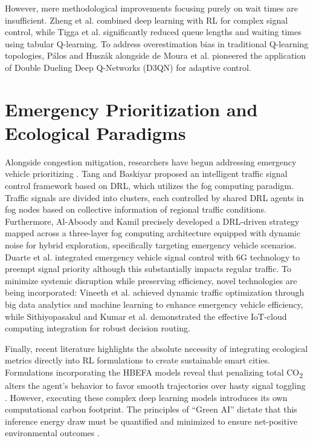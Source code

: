 However, mere methodological improvements focusing purely on wait times are insufficient. Zheng et al. \cite{zheng_dlrl} combined deep learning with RL for complex signal control, while Tigga et al. \cite{tigga_qlearning} significantly reduced queue lengths and waiting times using tabular Q-learning. To address overestimation bias in traditional Q-learning topologies, P\'alos and Husz\'ak \cite{palos2021evaluation} alongside de Moura et al. \cite{demoura2022multi} pioneered the application of Double Dueling Deep Q-Networks (D3QN) for adaptive control.

\section{Emergency Prioritization and Ecological Paradigms}
Alongside congestion mitigation, researchers have begun addressing emergency vehicle prioritizing \cite{ieee_iot_2025}. Tang and Baskiyar \cite{tang_fog} proposed an intelligent traffic signal control framework based on DRL, which utilizes the fog computing paradigm. Traffic signals are divided into clusters, each controlled by shared DRL agents in fog nodes based on collective information of regional traffic conditions. Furthermore, Al-Aboody and Kamil \cite{ieee_iot_2025} precisely developed a DRL-driven strategy mapped across a three-layer fog computing architecture equipped with dynamic noise for hybrid exploration, specifically targeting emergency vehicle scenarios. Duarte et al. \cite{duarte_6g} integrated emergency vehicle signal control with 6G technology to preempt signal priority although this substantially impacts regular traffic. To minimize systemic disruption while preserving efficiency, novel technologies are being incorporated: Vineeth et al. \cite{vineeth_bigdata} achieved dynamic traffic optimization through big data analytics and machine learning to enhance emergency vehicle efficiency, while Sithiyopasakul \cite{sithiyopasakul_iot} and Kumar et al. \cite{kumar_iot} demonstrated the effective IoT-cloud computing integration for robust decision routing.

Finally, recent literature highlights the absolute necessity of integrating ecological metrics directly into RL formulations to create sustainable smart cities. Formulations incorporating the HBEFA models reveal that penalizing total CO\textsubscript{2} alters the agent's behavior to favor smooth trajectories over hasty signal toggling \cite{al2021deep, chen2023adaptive}. However, executing these complex deep learning models introduces its own computational carbon footprint. The principles of ``Green AI'' dictate that this inference energy draw must be quantified and minimized to ensure net-positive environmental outcomes \cite{schwartz2020green, oecd2022measuring}.

